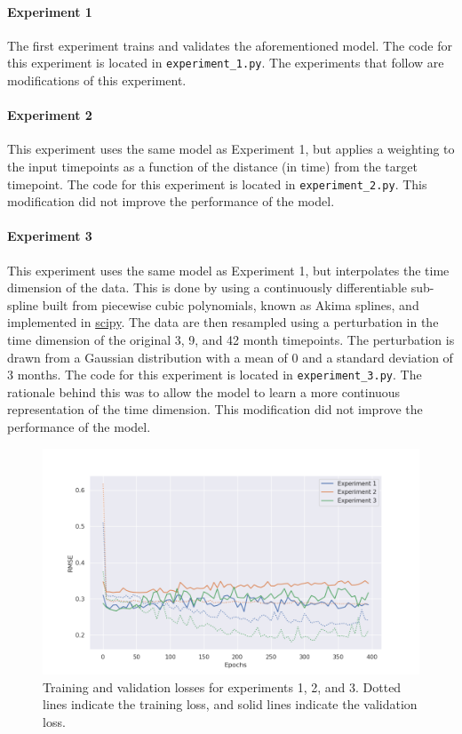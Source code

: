 \documentclass[twocolumn, 9pt]{extarticle}
\begin{document}
\paragraph{Experiment 1} The first experiment trains and validates the aforementioned model. The code for this experiment is located in \texttt{experiment\_1.py}. The experiments that follow are modifications of this experiment.

\paragraph{Experiment 2} This experiment uses the same model as Experiment 1, but applies a weighting to the input timepoints as a function of the distance (in time) from the target timepoint. The code for this experiment is located in \texttt{experiment\_2.py}. This modification did not improve the performance of the model.

\paragraph{Experiment 3} This experiment uses the same model as Experiment 1, but interpolates the time dimension of the data. This is done by using a continuously differentiable sub-spline built from piecewise cubic polynomials, known as Akima splines, and implemented in \href{https://docs.scipy.org/doc/scipy/reference/generated/scipy.interpolate.Akima1DInterpolator.html\#scipy.interpolate.Akima1DInterpolator}{scipy}. The data are then resampled using a perturbation in the time dimension of the original 3, 9, and 42 month timepoints. The perturbation is drawn from a Gaussian distribution with a mean of 0 and a standard deviation of 3 months. The code for this experiment is located in \texttt{experiment\_3.py}. The rationale behind this was to allow the model to learn a more continuous representation of the time dimension. This modification did not improve the performance of the model.

\begin{figure}
  \centering
  \includegraphics[width=\columnwidth]{plot_experiments_1_to_3.png}
  \caption{Training and validation losses for experiments 1, 2, and 3. Dotted lines indicate the training loss, and solid lines indicate the validation loss.}
  \label{fig:losses}
\end{figure}
\end{document}
